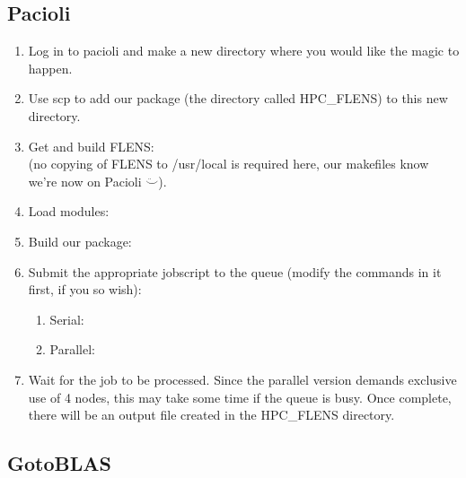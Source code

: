 \subsection{Pacioli}

\begin{enumerate}
   \item Log in to pacioli and make a new directory where you would like the magic to happen.
   \item Use scp to add our package (the directory called HPC\_FLENS) to this new directory.
   \item Get and build FLENS: 
   \\
   (no copying of FLENS to /usr/local is required here, our makefiles know we're now on Pacioli $\ddot\smile$).
   
   \item Load modules:
   
   \item Build our package:
   
   \item Submit the appropriate jobscript to the queue (modify the commands in it first, if you so wish):
   
   \begin{enumerate}
   \item Serial:
   
   \item Parallel:
   
   \end{enumerate}
   
   \item Wait for the job to be processed. Since the parallel version demands exclusive use of 4 nodes, this may take some time if the queue is busy. Once complete, there will be an output file created in the HPC\_FLENS directory.
      
      
 \end{enumerate}
 
 \subsection{GotoBLAS}
 
 
      
      